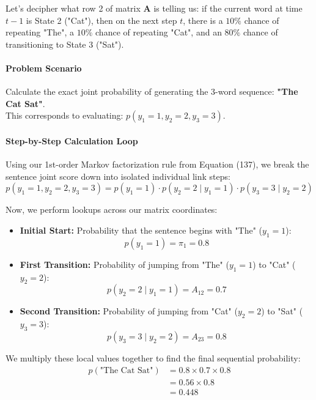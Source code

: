 \documentclass{article}
\begin{document}
Let's decipher what row 2 of matrix $\mathbf{A}$ is telling us: if the current word at time $t-1$ is State 2 ("Cat"), then on the next step $t$, there is a $10\%$ chance of repeating "The", a $10\%$ chance of repeating "Cat", and an $80\%$ chance of transitioning to State 3 ("Sat").

\paragraph{Problem Scenario}
Calculate the exact joint probability of generating the 3-word sequence: \textbf{"The Cat Sat"}. \\
This corresponds to evaluating: $p(y_1=1, y_2=2, y_3=3)$.

\paragraph{Step-by-Step Calculation Loop}
Using our 1st-order Markov factorization rule from Equation (137), we break the sentence joint score down into isolated individual link steps:
\begin{equation}
p(y_1=1, y_2=2, y_3=3) = p(y_1=1) \cdot p(y_2=2 \mid y_1=1) \cdot p(y_3=3 \mid y_2=2) \tag{140}
\end{equation}

Now, we perform lookups across our matrix coordinates:
\begin{itemize}
    \item \textbf{Initial Start:} Probability that the sentence begins with "The" ($y_1=1$):
    \begin{equation*}
    p(y_1=1) = \pi_1 = \mathbf{0.8}
    \end{equation*}
    \item \textbf{First Transition:} Probability of jumping from "The" ($y_1=1$) to "Cat" ($y_2=2$):
    \begin{equation*}
    p(y_2=2 \mid y_1=1) = A_{12} = \mathbf{0.7}
    \end{equation*}
    \item \textbf{Second Transition:} Probability of jumping from "Cat" ($y_2=2$) to "Sat" ($y_3=3$):
    \begin{equation*}
    p(y_3=3 \mid y_2=2) = A_{23} = \mathbf{0.8}
    \end{equation*}
\end{itemize}

We multiply these local values together to find the final sequential probability:
\begin{align}
p(\text{"The Cat Sat"}) &= 0.8 \times 0.7 \times 0.8 \nonumber \\
&= 0.56 \times 0.8 \nonumber \\
&= \mathbf{0.448} \tag{141}
\end{align}
\end{document}

